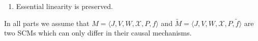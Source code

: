 \begin{enumerate}[label=10.\arabic*]
\begin{enumerate}
\begin{enumerate}
            \item $M$ is essentially uniquely solvable w.r.t.\ $L \ins V$ if and only if it $\tilde{M}$ is essentially uniquely solvable w.r.t.\ $L$,
            \item $g^{[L]}$ is an essentially unique solution function of $M$ w.r.t.\ $L \ins V$ if and only if it is an essentially unique solution function of $\tilde{M}$ w.r.t.\ $L$,
            \item $M$ is simple if and only if $\tilde{M}$ is simple;
        \end{enumerate}
        \item Essential linearity is preserved.
    \end{enumerate}
    \begin{ungradedsolution}
        In all parts we assume that $M = \langle J, V, W, \mathcal{X}, P, f \rangle$ and $\tilde{M} = \langle J, V, W, \mathcal{X}, P, \tilde{f} \rangle$ are two SCMs which can only differ in their causal mechanisms.


\end{ungradedsolution}
\end{enumerate}
